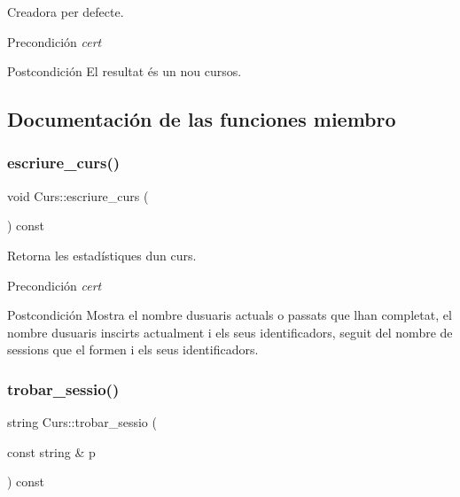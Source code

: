 Creadora per defecte. 

\begin{DoxyPrecond}{Precondición}
{\itshape cert} 
\end{DoxyPrecond}
\begin{DoxyPostcond}{Postcondición}
El resultat és un nou cursos. 
\end{DoxyPostcond}


\subsection{Documentación de las funciones miembro}
\mbox{\label{class_curs_a54b500f472e5ae51395bca6fe1e0bd09}} 
\subsubsection{\texorpdfstring{escriure\+\_\+curs()}{escriure\_curs()}}
{\footnotesize\ttfamily void Curs\+::escriure\+\_\+curs (\begin{DoxyParamCaption}{ }\end{DoxyParamCaption}) const}



Retorna les estadístiques d\textquotesingle{}un curs. 

\begin{DoxyPrecond}{Precondición}
{\itshape cert} 
\end{DoxyPrecond}
\begin{DoxyPostcond}{Postcondición}
Mostra el nombre d\textquotesingle{}usuaris actuals o passats que l\textquotesingle{}han completat, el nombre d\textquotesingle{}usuaris inscirts actualment i els seus identificadors, seguit del nombre de sessions que el formen i els seus identificadors. 
\end{DoxyPostcond}
\mbox{\label{class_curs_a6895416e7e0455a21d2389d050a0cfe0}} 
\subsubsection{\texorpdfstring{trobar\+\_\+sessio()}{trobar\_sessio()}}
{\footnotesize\ttfamily string Curs\+::trobar\+\_\+sessio (\begin{DoxyParamCaption}\item[{const string \&}]{p }\end{DoxyParamCaption}) const}



